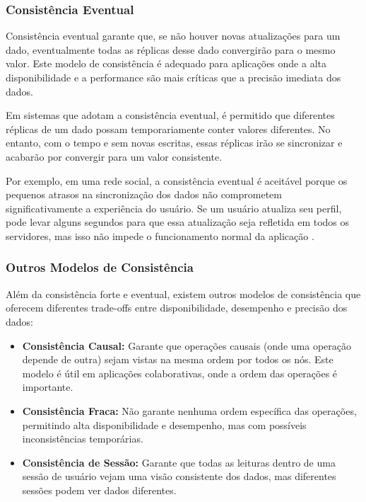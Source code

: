 \subsubsection{Consistência Eventual}

Consistência eventual garante que, se não houver novas atualizações para um dado, eventualmente todas as réplicas desse dado convergirão para o mesmo valor. Este modelo de consistência é adequado para aplicações onde a alta disponibilidade e a performance são mais críticas que a precisão imediata dos dados.

Em sistemas que adotam a consistência eventual, é permitido que diferentes réplicas de um dado possam temporariamente conter valores diferentes. No entanto, com o tempo e sem novas escritas, essas réplicas irão se sincronizar e acabarão por convergir para um valor consistente.

Por exemplo, em uma rede social, a consistência eventual é aceitável porque os pequenos atrasos na sincronização dos dados não comprometem significativamente a experiência do usuário. Se um usuário atualiza seu perfil, pode levar alguns segundos para que essa atualização seja refletida em todos os servidores, mas isso não impede o funcionamento normal da aplicação \cite{vogels2009}.

\subsubsection{Outros Modelos de Consistência}

Além da consistência forte e eventual, existem outros modelos de consistência que oferecem diferentes trade-offs entre disponibilidade, desempenho e precisão dos dados:

\begin{itemize}
    \item \textbf{Consistência Causal:} Garante que operações causais (onde uma operação depende de outra) sejam vistas na mesma ordem por todos os nós. Este modelo é útil em aplicações colaborativas, onde a ordem das operações é importante.
    \item \textbf{Consistência Fraca:} Não garante nenhuma ordem específica das operações, permitindo alta disponibilidade e desempenho, mas com possíveis inconsistências temporárias.
    \item \textbf{Consistência de Sessão:} Garante que todas as leituras dentro de uma sessão de usuário vejam uma visão consistente dos dados, mas diferentes sessões podem ver dados diferentes.
\end{itemize}

